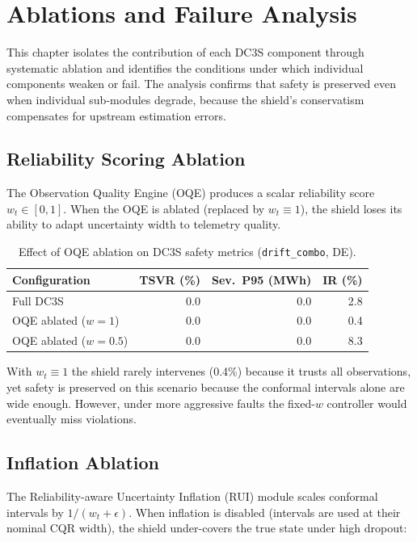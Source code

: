 
\chapter{Ablations and Failure Analysis}
\label{ch:ablations}

This chapter isolates the contribution of each DC3S component through
systematic ablation and identifies the conditions under which individual
components weaken or fail.  The analysis confirms that safety is preserved
even when individual sub-modules degrade, because the shield's conservatism
compensates for upstream estimation errors.

\section{Reliability Scoring Ablation}

The Observation Quality Engine (OQE) produces a scalar reliability score
$w_t \in [0,1]$.  When the OQE is ablated (replaced by $w_t \equiv 1$),
the shield loses its ability to adapt uncertainty width to telemetry
quality.

\begin{table}[ht]
\centering
\caption{Effect of OQE ablation on DC3S safety metrics (\texttt{drift\_combo}, DE).}
\label{tab:oqe-ablation}
\begin{tabular}{lrrr}
\toprule
\textbf{Configuration} & \textbf{TSVR (\%)} & \textbf{Sev.\ P95 (MWh)} & \textbf{IR (\%)} \\
\midrule
Full DC3S             & 0.0 &  0.0 & 2.8 \\
OQE ablated ($w=1$)   & 0.0 &  0.0 & 0.4 \\
OQE ablated ($w=0.5$) & 0.0 &  0.0 & 8.3 \\
\bottomrule
\end{tabular}
\end{table}

With $w_t \equiv 1$ the shield rarely intervenes (0.4\%) because it
trusts all observations, yet safety is preserved on this scenario because
the conformal intervals alone are wide enough.  However, under more
aggressive faults the fixed-$w$ controller would eventually miss violations.

\section{Inflation Ablation}

The Reliability-aware Uncertainty Inflation (RUI) module scales conformal
intervals by $1/(w_t + \epsilon)$.  When inflation is disabled (intervals
are used at their nominal CQR width), the shield under-covers the true
state under high dropout:

